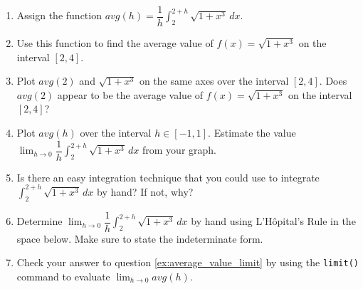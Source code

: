 \begin{enumerate}
    \item Assign the function $avg(h) = \dfrac{1}{h} \displaystyle\int_{2}^{2+h} \sqrt{1 + x^3}\, dx$.
    \item Use this function to find the average value of $f(x) = \sqrt{1+x^3}$ on the interval $[2,4]$.
    \item Plot $avg(2)$ and $\sqrt{1+x^3}$ on the same axes over the interval $[2,4]$. Does $avg(2)$ appear to be the average value of $f(x) = \sqrt{1+x^3}$ on the interval $[2,4]$?
    \item Plot $avg(h)$ over the interval $h\in[-1,1]$. Estimate the value $\displaystyle\lim_{h \rightarrow 0} \dfrac{1}{h} \displaystyle\int_{2}^{2+h} \sqrt{1 + x^3}\, dx$ from your graph.
    \item Is there an easy integration technique that you could use to integrate $\displaystyle\int_{2}^{2+h} \sqrt{1 + x^3}\, dx$ by hand? If not, why?
    \item Determine $\displaystyle\lim_{h \rightarrow 0} \dfrac{1}{h} \displaystyle\int_{2}^{2+h} \sqrt{1 + x^3} \,dx$ by hand using L'H\^opital's Rule in the space below. Make sure to state the indeterminate form. 
    \label{ex:average_value_limit}
    \par
    \item Check your answer to question \ref{ex:average_value_limit} by using the \texttt{limit()} command to evaluate $\displaystyle\lim_{h\rightarrow0}avg(h)$.
\end{enumerate}

